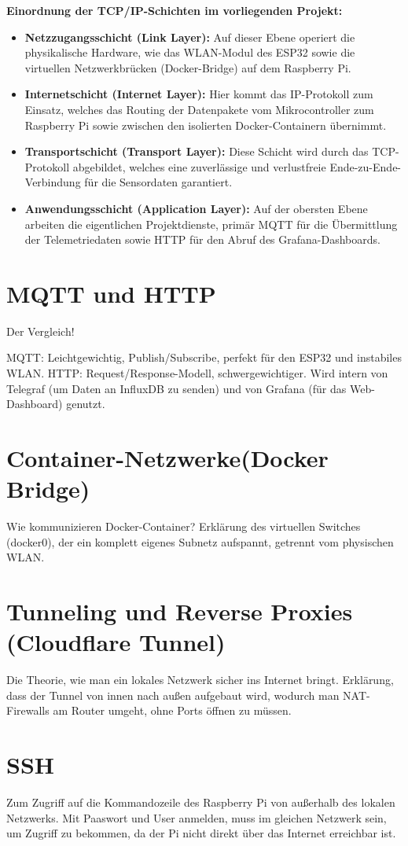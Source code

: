 \textbf{Einordnung der TCP/IP-Schichten im vorliegenden Projekt:}
\begin{itemize}
    \item \textbf{Netzzugangsschicht (Link Layer):} Auf dieser Ebene operiert die physikalische Hardware, wie das WLAN-Modul des ESP32 sowie die virtuellen Netzwerkbrücken (Docker-Bridge) auf dem Raspberry Pi.
    \item \textbf{Internetschicht (Internet Layer):} Hier kommt das IP-Protokoll zum Einsatz, welches das Routing der Datenpakete vom Mikrocontroller zum Raspberry Pi sowie zwischen den isolierten Docker-Containern übernimmt.
    \item \textbf{Transportschicht (Transport Layer):} Diese Schicht wird durch das TCP-Protokoll abgebildet, welches eine zuverlässige und verlustfreie Ende-zu-Ende-Verbindung für die Sensordaten garantiert.
    \item \textbf{Anwendungsschicht (Application Layer):} Auf der obersten Ebene arbeiten die eigentlichen Projektdienste, primär \ac{MQTT} für die Übermittlung der Telemetriedaten sowie HTTP für den Abruf des Grafana-Dashboards.
\end{itemize}



\section{MQTT und HTTP}
Der Vergleich!

MQTT: Leichtgewichtig, Publish/Subscribe, perfekt für den ESP32 und instabiles WLAN.
HTTP: Request/Response-Modell, schwergewichtiger. Wird intern von Telegraf (um Daten an InfluxDB zu senden) und von Grafana (für das Web-Dashboard) genutzt.

\section{Container-Netzwerke(Docker Bridge)}
Wie kommunizieren Docker-Container? Erklärung des virtuellen Switches (docker0), der ein komplett eigenes Subnetz aufspannt, getrennt vom physischen WLAN.


\section{Tunneling und Reverse Proxies (Cloudflare Tunnel)}
Die Theorie, wie man ein lokales Netzwerk sicher ins Internet bringt. Erklärung, dass der Tunnel von innen nach außen aufgebaut wird, wodurch man NAT-Firewalls am Router umgeht, ohne Ports öffnen zu müssen.

\section{SSH}
Zum Zugriff auf die Kommandozeile des Raspberry Pi von außerhalb des lokalen Netzwerks. Mit Paaswort und User anmelden, muss im gleichen Netzwerk sein, um Zugriff zu bekommen, da der Pi nicht direkt über das Internet erreichbar ist.